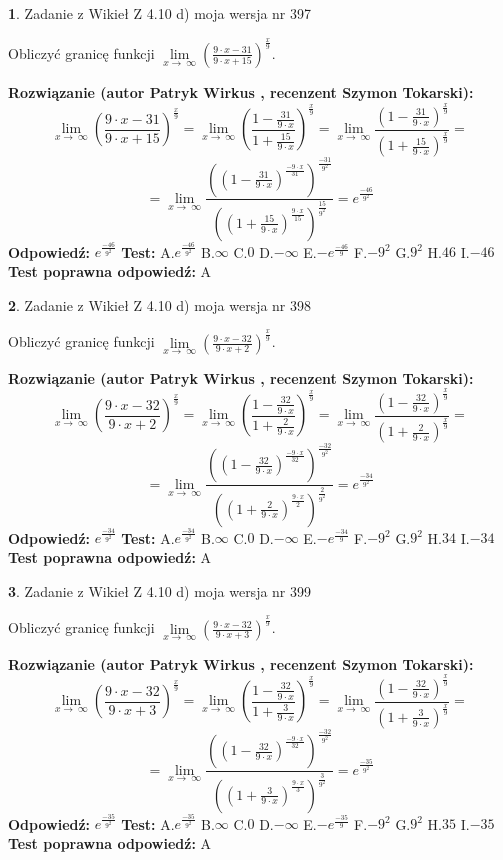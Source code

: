 \documentclass[12pt, a4paper]{article}
\theoremstyle{definition} %
\newtheorem{zad}{}
\newcommand{\zadStart}[1]{\begin{zad}#1\newline}
\newcommand{\zadStop}{\end{zad}}
\newcommand{\rozwStart}[2]{\noindent \textbf{Rozwiązanie (autor #1 , recenzent #2): }\newline}
\newcommand{\rozwStop}{\newline}
\newcommand{\odpStart}{\noindent \textbf{Odpowiedź:}\newline}
\newcommand{\odpStop}{\newline}
\newcommand{\testStart}{\noindent \textbf{Test:}\newline}
\newcommand{\testStop}{\newline}
\newcommand{\kluczStart}{\noindent \textbf{Test poprawna odpowiedź:}\newline}
\newcommand{\kluczStop}{\newline}
\begin{document}
\zadStart{Zadanie z Wikieł Z 4.10 d) moja wersja nr 397}


Obliczyć granicę funkcji  $\lim\limits_{x\to\ \infty}(\frac{9\cdot x-31}{9\cdot x+15})^{\frac{x}{9}}$.
\zadStop
\rozwStart{Patryk Wirkus}{Szymon Tokarski}
$$\lim\limits_{x\to\ \infty}(\frac{9\cdot x-31}{9\cdot x+15})^{\frac{x}{9}} = \lim\limits_{x\to\ \infty}(\frac{1-\frac{31}{9\cdot x}}{1+\frac{15}{9\cdot x}})^{\frac{x}{9}}=\lim\limits_{x\to\ \infty}\frac{(1-\frac{31}{9\cdot x})^{\frac{x}{9}}}{(1+\frac{15}{9\cdot x})^{\frac{x}{9}}}=$$
$$=\lim\limits_{x\to\ \infty}\frac{((1-\frac{31}{9\cdot x})^{\frac{-9\cdot x}{31}})^{\frac{-31}{9^{2}}}}{((1+\frac{15}{9\cdot x})^{\frac{9\cdot x}{15}})^{\frac{15}{9^{2}}}}=e^{\frac{-46}{9^{2}}}$$
\rozwStop
\odpStart
$e^{\frac{-46}{9^{2}}}$
\odpStop
\testStart
A.$e^{\frac{-46}{9^{2}}}$ B.$\infty$ C.$0$ D.$-\infty$ E.$-e^{\frac{-46}{9}}$
F.$-9^{2}$ G.$9^{2}$
H.$46$
I.$-46$
\testStop
\kluczStart
A
\kluczStop



\zadStart{Zadanie z Wikieł Z 4.10 d) moja wersja nr 398}


Obliczyć granicę funkcji  $\lim\limits_{x\to\ \infty}(\frac{9\cdot x-32}{9\cdot x+2})^{\frac{x}{9}}$.
\zadStop
\rozwStart{Patryk Wirkus}{Szymon Tokarski}
$$\lim\limits_{x\to\ \infty}(\frac{9\cdot x-32}{9\cdot x+2})^{\frac{x}{9}} = \lim\limits_{x\to\ \infty}(\frac{1-\frac{32}{9\cdot x}}{1+\frac{2}{9\cdot x}})^{\frac{x}{9}}=\lim\limits_{x\to\ \infty}\frac{(1-\frac{32}{9\cdot x})^{\frac{x}{9}}}{(1+\frac{2}{9\cdot x})^{\frac{x}{9}}}=$$
$$=\lim\limits_{x\to\ \infty}\frac{((1-\frac{32}{9\cdot x})^{\frac{-9\cdot x}{32}})^{\frac{-32}{9^{2}}}}{((1+\frac{2}{9\cdot x})^{\frac{9\cdot x}{2}})^{\frac{2}{9^{2}}}}=e^{\frac{-34}{9^{2}}}$$
\rozwStop
\odpStart
$e^{\frac{-34}{9^{2}}}$
\odpStop
\testStart
A.$e^{\frac{-34}{9^{2}}}$ B.$\infty$ C.$0$ D.$-\infty$ E.$-e^{\frac{-34}{9}}$
F.$-9^{2}$ G.$9^{2}$
H.$34$
I.$-34$
\testStop
\kluczStart
A
\kluczStop



\zadStart{Zadanie z Wikieł Z 4.10 d) moja wersja nr 399}


Obliczyć granicę funkcji  $\lim\limits_{x\to\ \infty}(\frac{9\cdot x-32}{9\cdot x+3})^{\frac{x}{9}}$.
\zadStop
\rozwStart{Patryk Wirkus}{Szymon Tokarski}
$$\lim\limits_{x\to\ \infty}(\frac{9\cdot x-32}{9\cdot x+3})^{\frac{x}{9}} = \lim\limits_{x\to\ \infty}(\frac{1-\frac{32}{9\cdot x}}{1+\frac{3}{9\cdot x}})^{\frac{x}{9}}=\lim\limits_{x\to\ \infty}\frac{(1-\frac{32}{9\cdot x})^{\frac{x}{9}}}{(1+\frac{3}{9\cdot x})^{\frac{x}{9}}}=$$
$$=\lim\limits_{x\to\ \infty}\frac{((1-\frac{32}{9\cdot x})^{\frac{-9\cdot x}{32}})^{\frac{-32}{9^{2}}}}{((1+\frac{3}{9\cdot x})^{\frac{9\cdot x}{3}})^{\frac{3}{9^{2}}}}=e^{\frac{-35}{9^{2}}}$$
\rozwStop
\odpStart
$e^{\frac{-35}{9^{2}}}$
\odpStop
\testStart
A.$e^{\frac{-35}{9^{2}}}$ B.$\infty$ C.$0$ D.$-\infty$ E.$-e^{\frac{-35}{9}}$
F.$-9^{2}$ G.$9^{2}$
H.$35$
I.$-35$
\testStop
\kluczStart
A
\kluczStop
\end{document}
